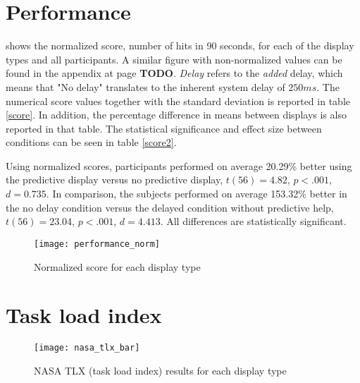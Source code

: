 \section{Performance}

 shows the normalized score, number of hits in 90 seconds, for each of the display types and all participants. A similar figure with non-normalized values can be found in the appendix at page \textbf{TODO}. \textit{Delay} refers to the \textit{added} delay, which means that "No delay" translates to the inherent system delay of $250 ms$. The numerical score values together with the standard deviation is reported in table \ref{score}. In addition, the percentage difference in means between displays is also reported in that table. The statistical significance and effect size between conditions can be seen in table \ref{score2}.

Using normalized scores, participants performed on average 20.29\% better using the predictive display versus no predictive display, $t(56)=4.82$, $p<.001$, $d=0.735$. In comparison, the subjects performed on average 153.32\% better in the no delay condition versus the delayed condition without predictive help, $t(56)=23.04$, $p<.001$, $d=4.413$. All differences are statistically significant.


\begin{figure}[h!]
    \centering
    \texttt{[image: performance\_norm]}
    \caption{Normalized score for each display type}
    \label{performanceNorm}
\end{figure}





\section{Task load index}

\begin{figure}[h!]
    \centering
    \texttt{[image: nasa\_tlx\_bar]}
    \caption{NASA TLX (task load index) results for each display type}
\end{figure}